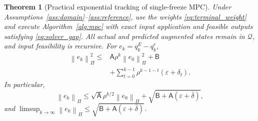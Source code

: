 \documentclass[journal]{IEEEtran}
\newtheorem{theorem}{Theorem}
\newcommand{\norm}[1]{\left\lVert #1\right\rVert}
\begin{document}
\begin{theorem}[Practical exponential tracking of single-freeze MPC]
\label{thm:tracking}
Under Assumptions~\ref{ass:domain}--\ref{ass:reference}, use the weights \eqref{eq:terminal_weight} and execute Algorithm~\ref{alg:mpc} with exact input application and feasible outputs satisfying \eqref{eq:solver_gap}. All actual and predicted augmented states remain in $\mathcal Q$, and input feasibility is recursive. For $e_k=q_k^E-q_k^r$,
\begin{equation}
\begin{split}
\norm{e_k}_\Pi^2\le{}&\mathsf A\rho^k\norm{e_0}_\Pi^2+\mathsf B\\
&+\sum_{t=0}^{k-1}\rho^{k-1-t}(\varepsilon+\delta_t).
\end{split}
\label{eq:squared_tracking_bound}
\end{equation}
In particular,
\begin{equation}
\norm{e_k}_\Pi\le\sqrt{\mathsf A}\rho^{k/2}\norm{e_0}_\Pi
+\sqrt{\mathsf B+\mathsf A(\varepsilon+\bar\delta)},
\label{eq:practical_tracking}
\end{equation}
and $\limsup_{k\to\infty}\norm{e_k}_\Pi\le
\sqrt{\mathsf B+\mathsf A(\varepsilon+\bar\delta)}$.
\end{theorem}
\end{document}
